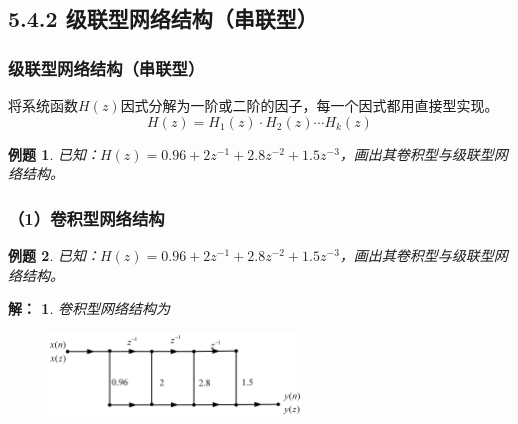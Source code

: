 \documentclass[notheorems,compress,mathserif,table]{beamer}
\newtheorem{example}{例题}
\newtheorem{answer}{解：}
\begin{document}
\subsection{5.4.2 级联型网络结构（串联型）}
\begin{frame}\frametitle{级联型网络结构（串联型）}%
将系统函数$H(z)$因式分解为一阶或二阶的因子，每一个因式都用直接型实现。
$$H(z)=H_1(z)\cdot H_2(z) \cdots H_k(z)$$
    \begin{example}
        \par 已知：$H(z) = 0.96+2z^{-1}+2.8z^{-2}+1.5z^{-3}$，画出其卷积型与级联型网络结构。
    \end{example}
\end{frame}
\begin{frame}\frametitle{（1）卷积型网络结构}%
    \begin{example}
        \par 已知：$H(z) = 0.96+2z^{-1}+2.8z^{-2}+1.5z^{-3}$，画出其卷积型与级联型网络结构。
    \end{example}
    \begin{answer}
        卷积型网络结构为
        \begin{figure}[h]
            \centering
            \includegraphics[width=0.6\textwidth]{lijuanjixing.jpg}
        \end{figure}
     \vspace{0.2cm}
    \end{answer}
\end{frame}
\end{document}
